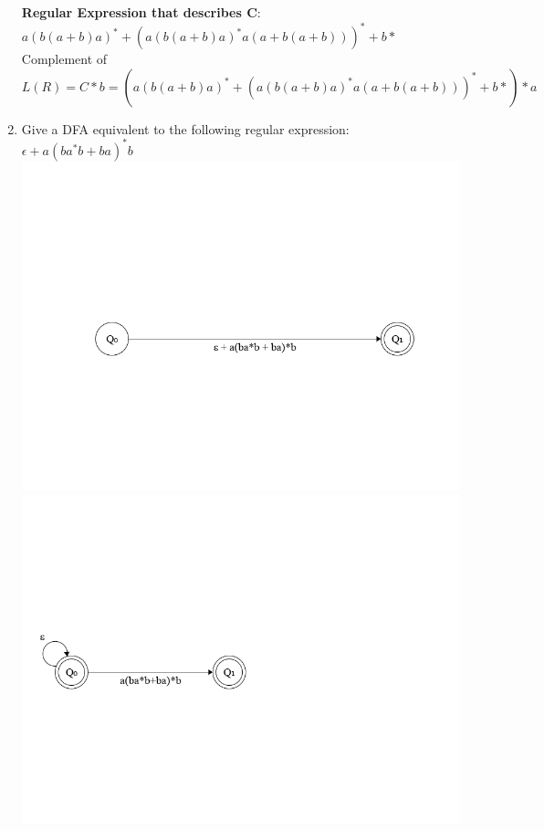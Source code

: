 \documentclass{article}
\begin{document}
\begin{enumerate}
			\textbf{Regular Expression that describes C}: $a(b(a+b)a)^* + (a(b(a+b)a)^*a(a+b(a+b)))^* + b*$\\
			Complement of $L(R) = C*b = (a(b(a+b)a)^* + (a(b(a+b)a)^*a(a+b(a+b)))^* + b*)*a$

		\item Give a DFA equivalent to the following regular expression:\\
			$\epsilon + a(ba^*b + ba)^*b$\\
			\includegraphics[width=\textwidth]{p2_1.png}\\
			\includegraphics[width=\textwidth]{p2_2.png}\\

\end{enumerate}
\end{document}
